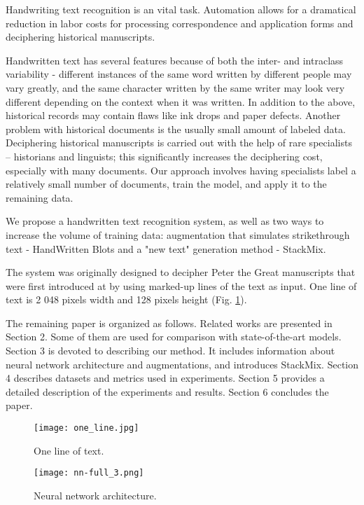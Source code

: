 \documentclass[10pt,twocolumn,letterpaper]{article}
\begin{document}
Handwriting text recognition is an vital task. Automation allows for a dramatical reduction in labor costs for processing correspondence and application forms and deciphering historical manuscripts. 

Handwritten text has several features because of both the inter- and intraclass variability - different instances of the same word written by different people may vary greatly, and the same character written by the same writer may look very different depending on the context when it was written. In addition to the above, historical records may contain flaws like ink drops and paper defects. Another problem with historical documents is the usually small amount of labeled data. 
Deciphering historical manuscripts is carried out with the help of rare specialists – historians and linguists; this significantly increases the deciphering cost, especially with many documents. Our approach involves having specialists label a relatively small number of documents, train the model, and apply it to the remaining data.

We propose a handwritten text recognition system, as well as two ways to increase the volume of training data: augmentation that simulates strikethrough text - HandWritten Blots and a "new text" generation method - StackMix.

The system was originally designed to decipher Peter the Great manuscripts that were first introduced at \cite{potanin2021digital} by using marked-up lines of the text as input. One line of text is 2 048 pixels width and 128 pixels height (Fig. \ref{fig:one_line}).


The remaining paper is organized as follows. Related works are presented in Section 2. Some of them are used for comparison with state-of-the-art models. Section 3 is devoted to describing our method. It includes information about neural network architecture and augmentations, and introduces StackMix. Section 4 describes datasets and metrics used in experiments. Section 5 provides a detailed description of the experiments and results. Section 6 concludes the paper.

\begin{figure}[t]
\begin{center}
\texttt{[image: one\_line.jpg]}
\end{center}
   \caption{One line of text.}
\label{fig:one_line}
\end{figure}

\begin{figure*}
\begin{center}
\texttt{[image: nn-full\_3.png]}
\end{center}
   \caption{Neural network architecture.}
\label{fig:fig:nn}
\end{figure*}
\end{document}
